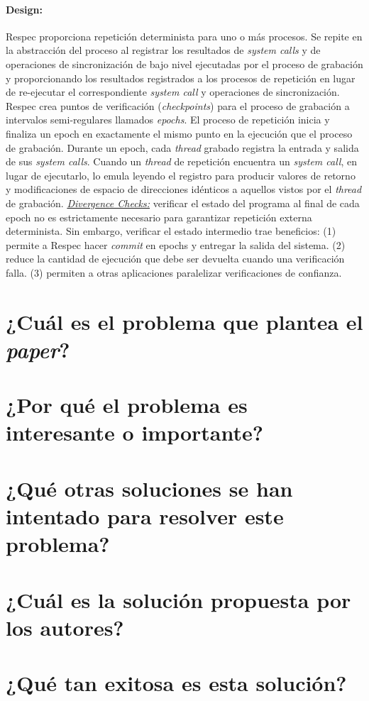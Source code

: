 \paragraph{\textnormal{\textbf{Design:}}}
Respec proporciona repetición determinista para uno o más procesos. Se repite en la abstracción del proceso al registrar los resultados de \emph{system calls} y de operaciones de sincronización de bajo nivel ejecutadas por el proceso de grabación y proporcionando los resultados registrados a los procesos de repetición en lugar de re-ejecutar el correspondiente \emph{system call} y operaciones de sincronización. Respec crea puntos de verificación (\emph{checkpoints}) para el proceso de grabación a intervalos semi-regulares llamados \emph{epochs}. El proceso de repetición inicia y finaliza un epoch en exactamente el mismo punto en la ejecución que el proceso de grabación. Durante un epoch, cada \emph{thread} grabado registra la entrada y salida de sus \emph{system calls}. Cuando un \emph{thread} de repetición encuentra un \emph{system call}, en lugar de ejecutarlo, lo emula leyendo el registro para producir valores de retorno y modificaciones de espacio de direcciones idénticos a aquellos vistos por el \emph{thread} de grabación. \underline{\emph{Divergence Checks:}} verificar el estado del programa al final de cada epoch no es estrictamente necesario para garantizar repetición externa determinista. Sin embargo, verificar el estado intermedio trae beneficios: (1) permite a Respec hacer \emph{commit} en epochs y entregar la salida del sistema. (2) reduce la cantidad de ejecución que debe ser devuelta cuando una verificación falla. (3) permiten a  otras aplicaciones paralelizar verificaciones de confianza.


\section{¿Cuál es el problema que plantea el \textit{paper}?}

\section{¿Por qué el problema es interesante o importante?}

\section{¿Qué otras soluciones se han intentado para resolver este problema?}
     
\section{¿Cuál es la solución propuesta por los autores?}

\section{¿Qué tan exitosa es esta solución?} 